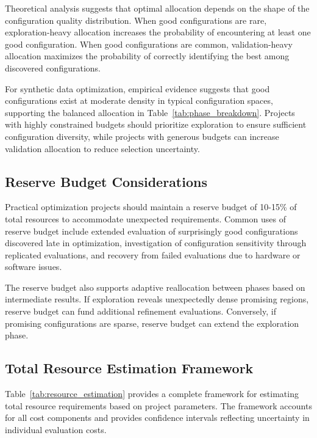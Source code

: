 Theoretical analysis suggests that optimal allocation depends on the shape of the configuration quality distribution. When good configurations are rare, exploration-heavy allocation increases the probability of encountering at least one good configuration. When good configurations are common, validation-heavy allocation maximizes the probability of correctly identifying the best among discovered configurations.

For synthetic data optimization, empirical evidence suggests that good configurations exist at moderate density in typical configuration spaces, supporting the balanced allocation in Table~\ref{tab:phase_breakdown}. Projects with highly constrained budgets should prioritize exploration to ensure sufficient configuration diversity, while projects with generous budgets can increase validation allocation to reduce selection uncertainty.

\subsection{Reserve Budget Considerations}

Practical optimization projects should maintain a reserve budget of 10-15\% of total resources to accommodate unexpected requirements. Common uses of reserve budget include extended evaluation of surprisingly good configurations discovered late in optimization, investigation of configuration sensitivity through replicated evaluations, and recovery from failed evaluations due to hardware or software issues.

The reserve budget also supports adaptive reallocation between phases based on intermediate results. If exploration reveals unexpectedly dense promising regions, reserve budget can fund additional refinement evaluations. Conversely, if promising configurations are sparse, reserve budget can extend the exploration phase.

\subsection{Total Resource Estimation Framework}

Table~\ref{tab:resource_estimation} provides a complete framework for estimating total resource requirements based on project parameters. The framework accounts for all cost components and provides confidence intervals reflecting uncertainty in individual evaluation costs.

